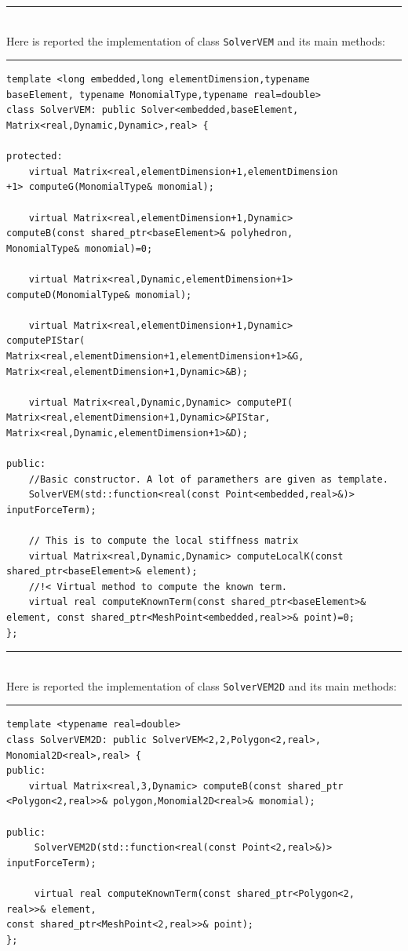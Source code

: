 \noindent\rule{16cm}{1pt}\\

Here is reported the implementation of class \verb|SolverVEM| and its main methods:

\noindent\rule{16cm}{1pt}
\begin{lstlisting}[caption=File \texttt{SolverVEM.h}]
template <long embedded,long elementDimension,typename 
baseElement, typename MonomialType,typename real=double>
class SolverVEM: public Solver<embedded,baseElement,
Matrix<real,Dynamic,Dynamic>,real> {

protected:
    virtual Matrix<real,elementDimension+1,elementDimension
+1> computeG(MonomialType& monomial);

    virtual Matrix<real,elementDimension+1,Dynamic> 
computeB(const shared_ptr<baseElement>& polyhedron,
MonomialType& monomial)=0;

    virtual Matrix<real,Dynamic,elementDimension+1> 
computeD(MonomialType& monomial);
	
    virtual Matrix<real,elementDimension+1,Dynamic> 
computePIStar(
Matrix<real,elementDimension+1,elementDimension+1>&G,
Matrix<real,elementDimension+1,Dynamic>&B);

    virtual Matrix<real,Dynamic,Dynamic> computePI(
Matrix<real,elementDimension+1,Dynamic>&PIStar,
Matrix<real,Dynamic,elementDimension+1>&D);
	
public:
    //Basic constructor. A lot of paramethers are given as template.
    SolverVEM(std::function<real(const Point<embedded,real>&)>
inputForceTerm);
	
    // This is to compute the local stiffness matrix
    virtual Matrix<real,Dynamic,Dynamic> computeLocalK(const
shared_ptr<baseElement>& element); 
    //!< Virtual method to compute the known term.
    virtual real computeKnownTerm(const shared_ptr<baseElement>& 
element, const shared_ptr<MeshPoint<embedded,real>>& point)=0; 
};
\end{lstlisting}

\noindent\rule{16cm}{1pt}\\

Here is reported the implementation of class \verb|SolverVEM2D| and its main methods:

\noindent\rule{16cm}{1pt}
\begin{lstlisting}[caption=File \texttt{SolverVEM2D.h}]
template <typename real=double>
class SolverVEM2D: public SolverVEM<2,2,Polygon<2,real>,
Monomial2D<real>,real> {
public:
    virtual Matrix<real,3,Dynamic> computeB(const shared_ptr
<Polygon<2,real>>& polygon,Monomial2D<real>& monomial);

public:
     SolverVEM2D(std::function<real(const Point<2,real>&)> 
inputForceTerm);
    
     virtual real computeKnownTerm(const shared_ptr<Polygon<2,
real>>& element,
const shared_ptr<MeshPoint<2,real>>& point);
};
\end{lstlisting}

